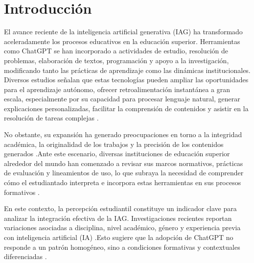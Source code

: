 \documentclass[spanish]{textolivre}
\begin{document}
\begin{polyabstract}
\begin{english}
\begin{abstract}
\end{abstract}
\end{english}
\end{polyabstract}

\section{ Introducción}\label{sec-intro}


El avance reciente de la inteligencia artificial generativa (IAG) ha transformado aceleradamente los procesos educativos en la educación superior. Herramientas como ChatGPT se han incorporado a actividades de estudio, resolución de problemas, elaboración de textos, programación y apoyo a la investigación, modificando tanto las prácticas de aprendizaje como las dinámicas institucionales. Diversos estudios señalan que estas tecnologías pueden ampliar las oportunidades para el aprendizaje autónomo, ofrecer retroalimentación instantánea a gran escala, especialmente por su capacidad para procesar lenguaje natural, generar explicaciones personalizadas, facilitar la comprensión de contenidos y asistir en la resolución de tareas complejas \cite{BaidooAnuOwusuAnsah2023,CromptonBurke2023,Dempere2023,MaiVanDaVanHanh2024,ZawackiRichterMarinBondGouverneur2019}.

No obstante, su expansión ha generado preocupaciones en torno a la integridad académica, la originalidad de los trabajos y la precisión de los contenidos generados \cite{Cotton2024,Dwivedi2023,Luo2024}.Ante este escenario, diversas instituciones de educación superior alrededor del mundo han comenzado a revisar sus marcos normativos, prácticas de evaluación y lineamientos de uso, lo que subraya la necesidad de comprender cómo el estudiantado interpreta e incorpora estas herramientas en sus procesos formativos \cite{MichelVillarreal2023,Zhang2025}.

En este contexto, la percepción estudiantil constituye un indicador clave para analizar la integración efectiva de la IAG. Investigaciones recientes reportan variaciones asociadas a disciplina, nivel académico, género y experiencia previa con inteligencia artificial (IA) \cite{BlahopoulouOrtizBonnin2025,KlimovaDeCampos2024,StohrOuMalmstrom2024}.Esto sugiere que la adopción de ChatGPT no responde a un patrón homogéneo, sino a condiciones formativas y contextuales diferenciadas \cite{Ravselj2025}.
\end{document}
